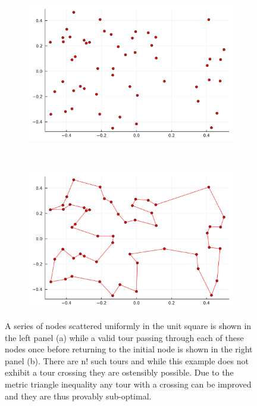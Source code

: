 \begin{figure}
	\begin{subfigure}{0.5\linewidth}
		\includegraphics[width = \textwidth]{images/introduction/tourscatter}
		\caption{} 
	\end{subfigure}
	~
	\begin{subfigure}{0.5\linewidth}
		\includegraphics[width = \textwidth]{images/introduction/tourvalid}
		\caption{} 
	\end{subfigure}
	\def\c{A description of the Travelling Salesman Problem. }
	\caption[\c]{A series of nodes scattered uniformly in the unit square is shown in the left panel (a) while a valid tour passing through each of these nodes once before returning to the initial node is shown in the right panel (b). There are n! such tours and while this example does not exhibit a tour crossing they are ostensibly possible. Due to the metric triangle inequality any tour with a crossing can be improved and they are thus provably sub-optimal.}
\end{figure}

